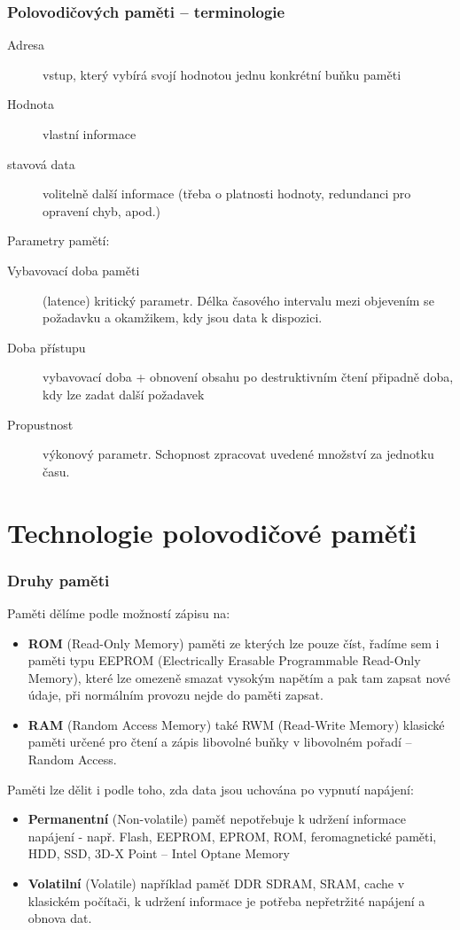 \documentclass{beamer}
\begin{document}
\begin{frame}
\frametitle{Polovodičových paměti -- terminologie}

\begin{description}
 \item[Adresa] vstup, který vybírá svojí hodnotou jednu konkrétní buňku paměti
 \item[Hodnota] vlastní informace
 \item[stavová data] volitelně další informace (třeba o platnosti hodnoty, redundanci pro opravení chyb, apod.)
\end{description}

Parametry pamětí:

\begin{description}
  \item[Vybavovací doba paměti] (latence) kritický parametr. Délka časového intervalu mezi objevením se požadavku a okamžikem, kdy jsou data k dispozici.
  \item[Doba přístupu] vybavovací doba + obnovení obsahu po destruktivním čtení připadně doba, kdy lze zadat další požadavek
  \item[Propustnost] výkonový parametr. Schopnost zpracovat uvedené množství za jednotku času.
\end{description}

\end{frame}

\section{Technologie polovodičové paměťi}

\begin{frame}
\frametitle{Druhy paměti}

Paměti dělíme podle možností zápisu na:
\begin{itemize}
\item \textbf{ROM} (Read-Only Memory) paměti ze kterých lze pouze číst, řadíme sem i paměti typu EEPROM (Electrically Erasable Programmable Read-Only Memory), které lze omezeně smazat vysokým napětím a pak tam zapsat nové údaje, při normálním provozu nejde do paměti zapsat.
\item \textbf{RAM} (Random Access Memory) také RWM (Read-Write Memory) klasické paměti určené pro čtení a zápis libovolné buňky v libovolném pořadí -- Random Access.
\end{itemize}

Paměti lze dělit i podle toho, zda data jsou uchována po vypnutí napájení:
\begin{itemize}
\item \textbf{Permanentní} (Non-volatile) paměť nepotřebuje k udržení informace napájení - např. Flash, EEPROM, EPROM, ROM, feromagnetické paměti, HDD, SSD, 3D-X Point -- Intel Optane Memory
\item \textbf{Volatilní} (Volatile) například paměť DDR SDRAM, SRAM, cache v klasickém počítači, k udržení informace je potřeba nepřetržité napájení a obnova dat.
\end{itemize}
\end{frame}
\end{document}
